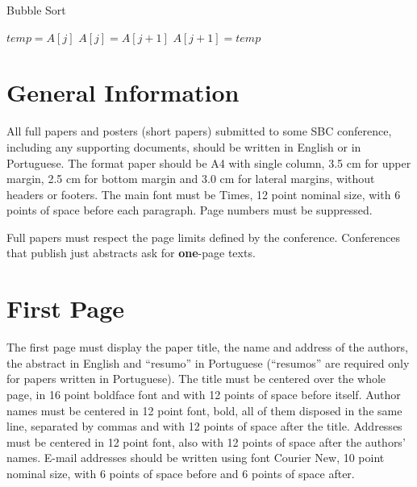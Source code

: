 \documentclass[12pt]{article}
\begin{document}
	\begin{algorithm}
		\caption{Bubble Sort}
		\begin{algorithmic}[1]
							\State $temp = A[j]$		
							\State $A[j] = A[j+1]$			
							\State $A[j+1] = temp$				
						\EndIf
					\EndFor						
				\EndFor				
			\EndFunction
			
			
		\end{algorithmic}
	\end{algorithm}



\section{General Information}

All full papers and posters (short papers) submitted to some SBC conference,
including any supporting documents, should be written in English or in
Portuguese. The format paper should be A4 with single column, 3.5 cm for upper
margin, 2.5 cm for bottom margin and 3.0 cm for lateral margins, without
headers or footers. The main font must be Times, 12 point nominal size, with 6
points of space before each paragraph. Page numbers must be suppressed.

Full papers must respect the page limits defined by the conference.
Conferences that publish just abstracts ask for \textbf{one}-page texts.

\section{First Page} \label{sec:firstpage}

The first page must display the paper title, the name and address of the
authors, the abstract in English and ``resumo'' in Portuguese (``resumos'' are
required only for papers written in Portuguese). The title must be centered
over the whole page, in 16 point boldface font and with 12 points of space
before itself. Author names must be centered in 12 point font, bold, all of
them disposed in the same line, separated by commas and with 12 points of
space after the title. Addresses must be centered in 12 point font, also with
12 points of space after the authors' names. E-mail addresses should be
written using font Courier New, 10 point nominal size, with 6 points of space
before and 6 points of space after.
\end{document}
